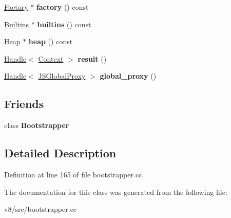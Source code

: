 \begin{DoxyCompactItemize}
\mbox{\hyperlink{classv8_1_1internal_1_1Factory}{Factory}} $\ast$ {\bfseries factory} () const
\item 
\mbox{\label{classv8_1_1internal_1_1Genesis_a94065c4356e5ea41742fd15ae9d543e7}} 
\mbox{\hyperlink{classv8_1_1internal_1_1Builtins}{Builtins}} $\ast$ {\bfseries builtins} () const
\item 
\mbox{\label{classv8_1_1internal_1_1Genesis_a4bbd5b1dce948b47c6e6919c5d77c6ec}} 
\mbox{\hyperlink{classv8_1_1internal_1_1Heap}{Heap}} $\ast$ {\bfseries heap} () const
\item 
\mbox{\label{classv8_1_1internal_1_1Genesis_a355812d4194d9859ff052e1d1dfb2b4c}} 
\mbox{\hyperlink{classv8_1_1internal_1_1Handle}{Handle}}$<$ \mbox{\hyperlink{classv8_1_1internal_1_1Context}{Context}} $>$ {\bfseries result} ()
\item 
\mbox{\label{classv8_1_1internal_1_1Genesis_a75c7ef8f47628eaacf451aff087929a2}} 
\mbox{\hyperlink{classv8_1_1internal_1_1Handle}{Handle}}$<$ \mbox{\hyperlink{classv8_1_1internal_1_1JSGlobalProxy}{J\+S\+Global\+Proxy}} $>$ {\bfseries global\+\_\+proxy} ()
\end{DoxyCompactItemize}
\subsection*{Friends}
\begin{DoxyCompactItemize}
\item 
\mbox{\label{classv8_1_1internal_1_1Genesis_a9f6287f965eb4e105f67d204f94d55d2}} 
class {\bfseries Bootstrapper}
\end{DoxyCompactItemize}


\subsection{Detailed Description}


Definition at line 165 of file bootstrapper.\+cc.



The documentation for this class was generated from the following file\+:\begin{DoxyCompactItemize}
\item 
v8/src/bootstrapper.\+cc\end{DoxyCompactItemize}
